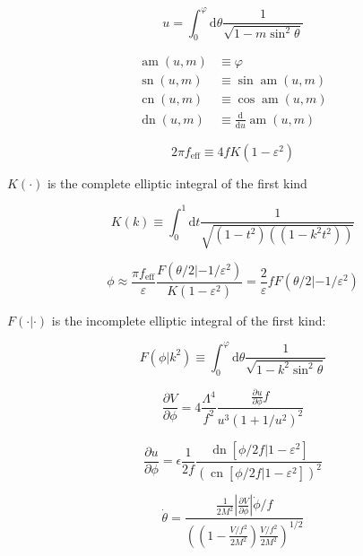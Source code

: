 \documentclass[master,       %
               twoside,        %
               BCOR10mm,       %
               english,ngerman, %
               ]{GAUBM}
\begin{document}
\begin{otherlanguage}{english}
\begin{equation}
	u = \int_0^\varphi \mathrm{d} \theta \frac{1}{\sqrt{1 - m \sin^2 \theta}}
\end{equation}

\begin{align}
	\operatorname{am}(u, m) &\equiv \varphi \\
	\operatorname{sn}(u, m) &\equiv \sin \operatorname{am}(u, m) \\
	\operatorname{cn}(u, m) &\equiv \cos \operatorname{am}(u, m) \\
	\operatorname{dn}(u, m) &\equiv \frac{\mathrm{d}}{\mathrm{d} u} \operatorname{am}(u, m) 
\end{align}


\begin{equation}
	2 \pi f_\mathrm{eff} \equiv 4 f K(1 - \varepsilon^2)
\end{equation}

$K(\cdot)$ is the complete elliptic integral of the first
kind

\begin{equation}
	K(k) \equiv \int_0^1 \mathrm{d}t \frac{1}{\sqrt{(1 - t^2)((1 - k^2t^2))}}
\end{equation}


\begin{equation}
	\phi \approx \frac{\pi f_\mathrm{eff}}{\varepsilon} \frac{F(\theta/2 | - 1 / \varepsilon^2)}{K(1 - \varepsilon^2)} = \frac{2}{\varepsilon} f F(\theta / 2 | - 1 / \varepsilon^2)
\end{equation}

$F( \cdot | \cdot )$ is the incomplete elliptic integral of the first kind:

\begin{equation}
	F(\phi | k^2) \equiv \int_0^\varphi \mathrm{d} \theta \frac{1}{\sqrt{1 - k^2 \sin^2 \theta}} 
\end{equation}

\begin{equation}
	\frac{\partial V}{\partial \phi} = 4 \frac{\Lambda^4}{f^2} \frac{\frac{\partial u}{\partial \phi} f}{u^3(1 + 1/u^2)^2}
\end{equation}

\begin{equation}
	\frac{\partial u}{\partial \phi} = \epsilon \frac{1}{2 f} \frac{\operatorname{dn}[\phi/2f|1 - \varepsilon^2]}{(\operatorname{cn}[\phi/2f|1 - \varepsilon^2])^2}
\end{equation}

\begin{equation}
	\dot{\theta} = \frac{\frac{1}{2M^2} \left| \frac{\partial V}{\partial \phi} \right| \dot{\phi} / f}{\left(\left(1 - \frac{V/f^2}{2M^2}\right) \frac{V / f^2}{2 M^2} \right)^{1/2}}
\end{equation}


\end{otherlanguage}
\end{document}
